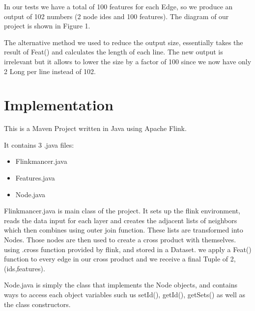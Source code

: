 In our tests we have a total of 100 features for each Edge, so we produce an output of 102 numbers (2 node ides and 100 features). The diagram of our project is shown in Figure 1.

The alternative method we used to reduce the output size, essentially takes the result of Feat() and calculates the length of each line. The new output is irrelevant but it allows to lower the size by a factor of 100 since we now have only 2 Long per line instead of 102.



\section{Implementation}

This is a Maven Project written in Java using Apache Flink. 

It contains 3 .java files:
\begin{itemize} 
\item Flinkmancer.java
\item Features.java
\item Node.java
\end{itemize}

Flinkmancer.java is main class of the project. It sets up the flink environment, reads the data input for each layer and creates the adjacent lists of neighbors which then combines using outer join function. These lists are transformed into Nodes. Those nodes are then used to create a cross product with themselves. using .cross function provided by flink, and stored in a Dataset. we apply a Feat() function to every edge in our cross product and we receive a final Tuple of 2, (ids,features). \newline

Node.java is simply the class that implements the Node objects, and contains ways to access each object variables such us setId(), getId(), getSets() as well as the class constructors. \newline

